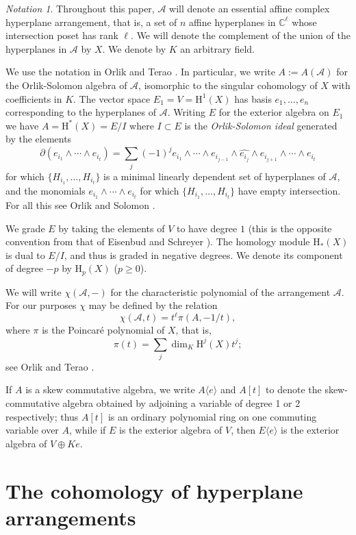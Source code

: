 \documentclass{tran-l}
\theoremstyle{definition}
\theoremstyle{remark}
\newtheorem*{nota}{Notation}
\newcommand{\CC}{{\mathbb{C}}}
\newcommand{\Acal}{{{\mathcal A}}}
\newcommand{\rH}{{\mathrm H}}
\begin{document}
\begin{nota} Throughout this paper, $\Acal$ will denote an essential affine complex
hyperplane arrangement, that is, a set of $n$ affine hyperplanes in
$\CC^\ell$ whose intersection poset has rank $\ell$. We will denote the
complement of the union of the hyperplanes in $\Acal$ by  $X$. We denote
by $K$  an arbitrary field.

We use the notation in Orlik and Terao \cite{OT}.  In particular, we write
$A:=A(\Acal)$ for the Orlik-Solomon algebra of $\Acal$, isomorphic to the
singular cohomology of $X$ with coefficients in $K$.  
The vector space $E_1=V=\rH^1(X)$ has basis $e_1,\ldots,e_n$
corresponding to the hyperplanes of $\Acal$. Writing
$E$ for the exterior algebra on $E_1$ we have
$A=\rH^*(X)=E/I$ where
$I\subset E$ is the {\it Orlik-Solomon ideal\/} generated by the
elements
\[
\partial(e_{i_1}\wedge\cdots\wedge e_{i_t})=
\sum_j (-1)^j
e_{i_1}\wedge\cdots \wedge e_{i_{j-1}}\wedge \widehat {e_{i_j}}
                   \wedge e_{i_{j+1}}\wedge \cdots \wedge e_{i_t}
\]
for which
$\{ H_{i_1},\dots,H_{i_t}\}$ 
is a minimal linearly dependent set of hyperplanes of $\Acal$,
and the monomials $e_{i_1}\wedge\cdots\wedge e_{i_t}$ for which
$\{ H_{i_1},\dots,H_{i_t}\}$ 
have empty intersection. For all this see Orlik and Solomon \cite{OS}.

We grade $E$ by taking the elements of $V$ to have degree $1$
(this is the opposite convention from that of  Eisenbud and
Schreyer \cite{ES}). The homology module $\rH_*(X)$ is dual to $E/I$, and
thus is graded in negative degrees. We denote its component of degree
$-p$ by $\rH_p(X)$ ($p\geq 0$).

We will write
$\chi(\Acal,-)$ for the characteristic polynomial 
of the arrangement $\Acal$.
For our purposes $\chi$ may be defined by the relation
\[
\chi(\Acal,t)=t^{\ell}\pi(A,-1/t),
\] 
where $\pi$ is the Poincar\'e polynomial  of $X$, that is,
\[
\pi(t)=\sum_j\dim_K\rH^j(X)t^j;
\] 
see Orlik and Terao \cite[Definition 2.52 and Theorem 3.68]{OT}.

If $A$ is a skew commutative algebra, we write $A\langle e\rangle$
and $A[t]$  to denote the skew-commutative algebra obtained by
adjoining a variable of degree 1 or 2 respectively; thus $A[t]$
is an ordinary polynomial ring on one commuting variable over
$A$, while if $E$ is the exterior algebra of $V$, then 
$E\langle e\rangle$ is the exterior algebra of $V\oplus Ke$.
\end{nota}

\section{The cohomology of hyperplane arrangements}\label{cohoofhyparr}
\end{document}
